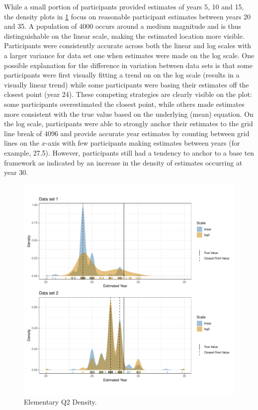 \documentclass[print]{nuthesis}
\begin{document}
While a small portion of participants provided estimates of years 5, 10 and 15, the density plots in \cref{fig:qe2-density-plot} focus on reasonable participant estimates between years 20 and 35.
A population of 4000 occurs around a medium magnitude and is thus distinguishable on the linear scale, making the estimated location more visible.
Participants were consistently accurate across both the linear and log scales with a larger variance for data set one when estimates were made on the log scale.
One possible explanation for the difference in variation between data sets is that some participants were first visually fitting a trend on on the log scale (results in a visually linear trend) while some participants were basing their estimates off the closest point (year 24).
These competing strategies are clearly visible on the plot: some participants overestimated the closest point, while others made estimates more consistent with the true value based on the underlying (mean) equation.
On the log scale, participants were able to strongly anchor their estimates to the grid line break of 4096 and provide accurate year estimates by counting between grid lines on the \(x\)-axis with few participants making estimates between years (for example, 27.5).
However, participants still had a tendency to anchor to a base ten framework as indicated by an increase in the density of estimates occurring at year 30.

\begin{figure}[tbp]

{\centering \includegraphics[width=1\linewidth,]{thesis_files/figure-latex/qe2-density-plot-1} 

}

\caption{Elementary Q2 Density. }\label{fig:qe2-density-plot}
\end{figure}
\end{document}
